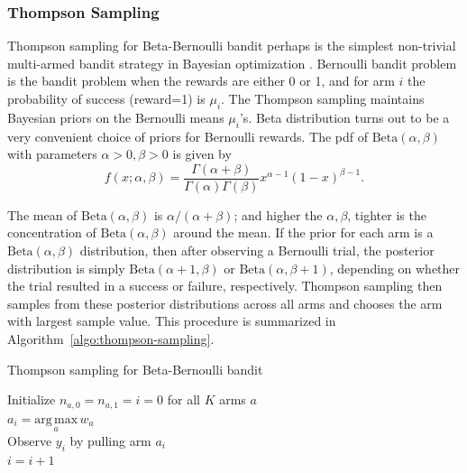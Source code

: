 \documentclass{article}
\begin{document}
\subsubsection{Thompson Sampling}
Thompson sampling for Beta-Bernoulli bandit perhaps is the simplest non-trivial multi-armed
bandit strategy in Bayesian optimization \cite{Shahriari2016-ho}. Bernoulli bandit problem is
the bandit problem when the rewards are either 0 or 1, and for arm $i$
the probability of success (reward=1) is $\mu_i$. The Thompson
sampling maintains Bayesian priors on the Bernoulli means
$\mu_i$'s. Beta distribution turns out to be a very convenient choice
of priors for Bernoulli rewards. The pdf of $\mathrm{Beta}(\alpha,
\beta)$ with parameters $\alpha > 0, \beta > 0$ is given by
\begin{equation}
  f(x;\alpha, \beta) = \frac{\Gamma(\alpha + \beta)}{\Gamma(\alpha)\Gamma(\beta)}x^{\alpha-1}(1-x)^{\beta-1}.
\end{equation}

The mean of $\mathrm{Beta}(\alpha,\beta)$ is $\alpha / (\alpha +
\beta)$; and higher the $\alpha, \beta$, tighter is the concentration
of $\mathrm{Beta}(\alpha,\beta)$ around the mean. If the prior
for each arm is a $\mathrm{Beta}(\alpha,\beta)$ distribution, then
after observing a Bernoulli trial, the posterior distribution is
simply $\mathrm{Beta}(\alpha + 1,\beta)$ or
$\mathrm{Beta}(\alpha,\beta +1)$, depending on whether the trial
resulted in a success or failure, respectively. Thompson sampling then
samples from these posterior distributions across all arms and chooses
the arm with largest sample value. This procedure is summarized in
Algorithm~\ref{algo:thompson-sampling}.

\begin{algorithm}[h] \label{algo:thompson-sampling}

  \caption{Thompson sampling for Beta-Bernoulli bandit}
  Initialize $n_{a,0}=n_{a,1}=i=0$ for all $K$ arms $a$ \\
   {
    $a_i = \underset{a}{\mathrm{arg\, max}}\, w_a$ \\
    Observe $y_i$ by pulling arm $a_i$ \\
    $i = i + 1$ \\
 }
\end{algorithm}
\end{document}
